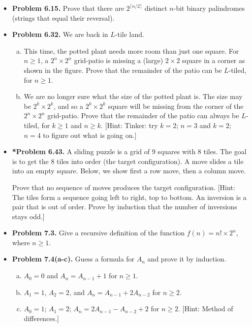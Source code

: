 \documentclass[11pt]{article}
\begin{document}
\begin{itemize}
\item \textbf{Problem 6.15.}
  Prove that there are $2^{\lceil n/2\rceil}$ distinct $n$-bit binary palindromes
  (strings that equal their reversal).

\vspace{0.1in}

\item \textbf{Problem 6.32.}
  We are back in $L$-tile land.
  \begin{enumerate}[(a)]
  \item This time, the potted plant needs more room than just one square.
    For $n\ge 1$, a $2^n\times 2^n$ grid-patio is missing a (large) $2\times 2$ square
    in a corner as shown in the figure.
    Prove that the remainder of the patio can be $L$-tiled, for $n\ge 1$.
  \item We are no longer sure what the size of the potted plant is.
    The size may be $2^k\times 2^k$, and so a $2^k\times 2^k$ square
    will be missing from the corner of the $2^n\times 2^n$ grid-patio.
    Prove that the remainder of the patio can always be $L$-tiled,
    for $k\ge 1$ and $n\ge k$.
    [Hint: Tinker: try $k=2$; $n=3$ and $k=2$; $n=4$ to figure out what is going on.]
  \end{enumerate}

\newpage

\item \textbf{*Problem 6.43.}
  A sliding puzzle is a grid of 9 squares with 8 tiles.
  The goal is to get the 8 tiles into order (the target configuration).
  A move slides a tile into an empty square.
  Below, we show first a row move, then a column move.

  Prove that no sequence of moves produces the target configuration.
  [Hint: The tiles form a sequence going left to right, top to bottom.
  An inversion is a pair that is out of order.
  Prove by induction that the number of inversions stays odd.]

\vspace{0.1in}

\item \textbf{Problem 7.3.}
  Give a recursive definition of the function $f(n)=n!\times 2^n$, where $n\ge 1$.

\vspace{0.1in}

\item \textbf{Problem 7.4(a-c).}
  Guess a formula for $A_n$ and prove it by induction.
  \begin{enumerate}[(a)]
  \item $A_0=0$ and $A_n=A_{n-1}+1$ for $n\ge 1$.
  \item $A_1=1$, $A_2=2$, and $A_n=A_{n-1}+2A_{n-2}$ for $n\ge 2$.
  \item $A_0=1$; $A_1=2$; $A_n=2A_{n-1}-A_{n-2}+2$ for $n\ge 2$.
    [Hint: Method of differences.]
  \end{enumerate}

\end{itemize}
\end{document}
